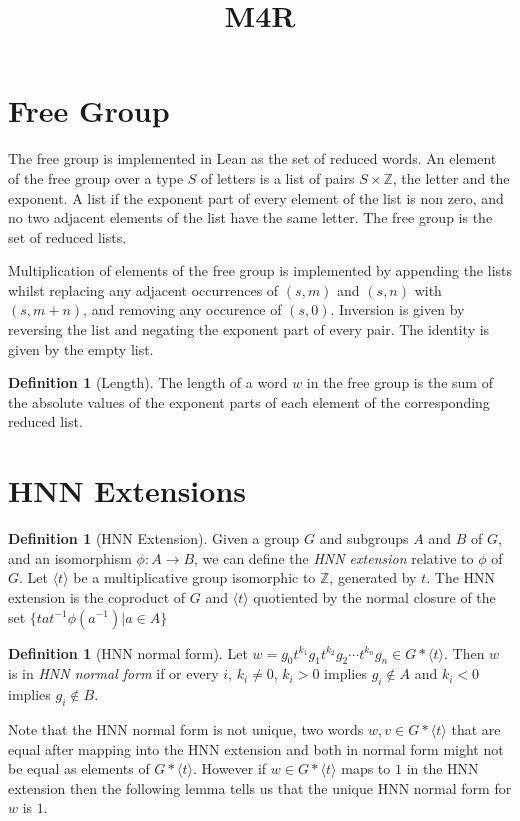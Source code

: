 \documentclass[11pt]{article} %
\title{M4R}
\theoremstyle{definition}
\theoremstyle{definition}
\theoremstyle{definition}
\theoremstyle{definition}
\theoremstyle{definition}
\newtheorem{defn}[theorem]{Definition}
\theoremstyle{definition}
\begin{document}
\section{Free Group}

The free group is implemented in Lean as the set of reduced words. An element of
the free group over a type $S$ of letters is a list of pairs $S \times \mathbb{Z}$,
the letter and the exponent.
A list if the exponent part of every element of the list is non zero, and
no two adjacent elements of the list have the same letter. The free group is the set of
reduced lists.

Multiplication of elements of the free group is implemented by appending the lists
whilst replacing any adjacent occurrences of $(s, m)$ and $(s, n)$ with $(s, m + n)$, and removing
any occurence of $(s, 0)$. Inversion is given by reversing the list and negating
the exponent part of every pair. The identity is given by the empty list.

\begin{defn}[Length]\label{length}
  The length of a word $w$ in the free group is the sum of the absolute values of the exponent
  parts of each element of the corresponding reduced list.
\end{defn}

\section{HNN Extensions}\label{HNN}

\begin{defn}[HNN Extension]
  Given a group $G$ and subgroups $A$ and $B$ of $G$, and an isomorphism $\phi : A \to B$, we can define
  the \textit{HNN extension} relative to $\phi$ of $G$. Let $\langle t \rangle$ be a multiplicative group isomorphic to
  $\mathbb{Z}$, generated by $t$. The HNN extension is the coproduct
  of $G$ and $\langle t \rangle$ quotiented
  by the normal closure of the set $\{ta t^{-1} \phi(a^{-1}) | a \in A\}$
\end{defn}

\begin{defn}[HNN normal form]\label{HNNnormalform}
  Let $w = g_0t^{k_1}g_1t^{k_2}g_2 \cdots t^{k_n}g_n \in G \ast \langle t \rangle$.
  Then $w$ is in \textit{HNN normal form} if or every $i$, $k_i \ne 0$, $k_i > 0$
  implies $g_i \notin A$ and $k_i < 0$ implies $g_i \notin B$.
\end{defn}

Note that the HNN normal form is not unique, two words $w, v \in G \ast \langle t \rangle$
that are equal after mapping into the HNN extension and both in normal form might not be
equal as elements of $G \ast \langle t \rangle$. However if $w \in G \ast \langle t \rangle $
maps to $1$ in the HNN extension
then the following lemma tells us that the unique HNN normal form for $w$ is $1$.
\end{document}
